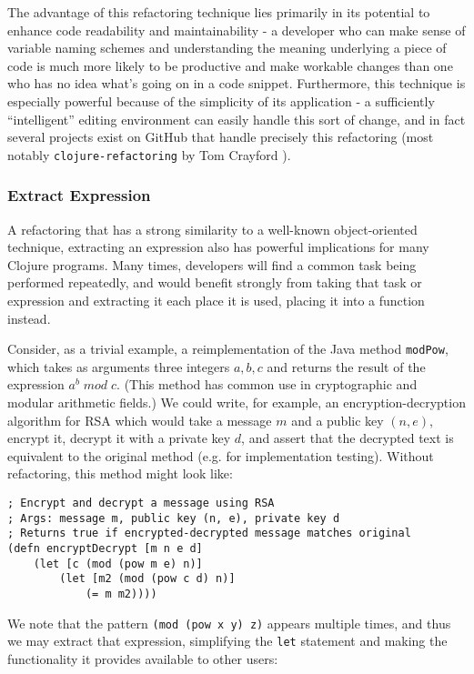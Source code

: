 The advantage of this refactoring technique lies primarily in its potential to enhance code readability and maintainability - a developer who can make sense of variable naming schemes and understanding the meaning underlying a piece of code is much more likely to be productive and make workable changes than one who has no idea what's going on in a code snippet. Furthermore, this technique is especially powerful because of the simplicity of its application - a sufficiently ``intelligent'' editing environment can easily handle this sort of change, and in fact several projects exist on GitHub that handle precisely this refactoring (most notably \verb!clojure-refactoring! by Tom Crayford \cite{clojurerefactoring}).

\subsubsection{Extract Expression}

A refactoring that has a strong similarity to a well-known object-oriented technique, extracting an expression also has powerful implications for many Clojure programs. Many times, developers will find a common task being performed repeatedly, and would benefit strongly from taking that task or expression and extracting it each place it is used, placing it into a function instead.

Consider, as a trivial example, a reimplementation of the Java method \verb!modPow!, which takes as arguments three integers $a, b, c$ and returns the result of the expression $a^{b} \; mod \; c$. (This method has common use in cryptographic and modular arithmetic fields.) We could write, for example, an encryption-decryption algorithm for RSA which would take a message $m$ and a public key $(n, e)$, encrypt it, decrypt it with a private key $d$, and assert that the decrypted text is equivalent to the original method (e.g. for implementation testing). Without refactoring, this method might look like:

\begin{verbatim}
; Encrypt and decrypt a message using RSA
; Args: message m, public key (n, e), private key d
; Returns true if encrypted-decrypted message matches original
(defn encryptDecrypt [m n e d]
    (let [c (mod (pow m e) n)]
        (let [m2 (mod (pow c d) n)]
            (= m m2))))
\end{verbatim}

We note that the pattern \verb!(mod (pow x y) z)! appears multiple times, and thus we may extract that expression, simplifying the \verb!let! statement and making the functionality it provides available to other users:

